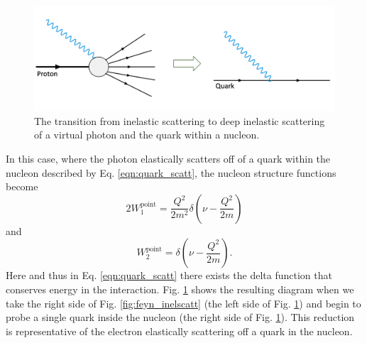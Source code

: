 \begin{figure}[h!]
	\centering
	\includegraphics[width=0.9\linewidth]{figures/inel_to_dis.png}
	\caption{The transition from inelastic scattering to deep inelastic scattering of a virtual photon and the quark within a nucleon.}
	\label{fig:feyn_inel_to_dis}
\end{figure}

In this case, where the photon elastically scatters off of a quark within the nucleon described by Eq. \ref{eqn:quark_scatt}, the nucleon structure functions become
\begin{equation}
\label{eqn:dis_sf_1}
2W_1^{\mathrm{point}} = \frac{Q^2}{2m^2} \delta \left( \nu - \frac{Q^2}{2m} \right)
\end{equation}
and
\begin{equation}
\label{eqn:dis_sf_2}
W_2^{\mathrm{point}} = \delta \left( \nu - \frac{Q^2}{2m} \right).
\end{equation}
Here and thus in Eq. \ref{eqn:quark_scatt} there exists the delta function that conserves energy in the interaction. Fig. \ref{fig:feyn_inel_to_dis} shows the resulting diagram when we take the right side of Fig. \ref{fig:feyn_inelscatt} (the left side of Fig. \ref{fig:feyn_inel_to_dis}) and begin to probe a single quark inside the nucleon (the right side of Fig. \ref{fig:feyn_inel_to_dis}). This reduction is representative of the electron elastically scattering off a quark in the nucleon.

